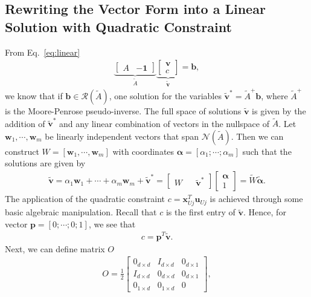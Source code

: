 \documentclass[%
preprint,
 amsmath,amssymb,
 aps,
]{revtex4-1}
\newcommand{\mc}{\mathcal}
\begin{document}
\subsection{Rewriting the Vector Form into a Linear Solution with Quadratic Constraint}
From Eq.~\ref{eq:linear}
\begin{align*}
\underbrace{
	\begin{bmatrix}
	A & -\bm{1}
	\end{bmatrix}
}_{\tilde{A}}
\underbrace{
	\begin{bmatrix}
	\bm{v}\\
	c
	\end{bmatrix}
}_{\tilde{\bm{v}}}
=
\bm{b},
\end{align*}
we know that if $\bm{b} \in \mc R(\tilde{A})$, one solution for the variables $\bm{\tilde{v}}^* = \tilde{A}^+ \bm{b}$, where $\tilde{A}^+$ is the Moore-Penrose pseudo-inverse. The full space of solutions $\tilde{\bm{v}}$ is given by the addition of $\bm{\tilde{v}}^*$ and any linear combination of vectors in the nullspace of $\tilde{A}$. Let ${\bm{w}_1, \dotsm, \bm{w}_m}$ be linearly independent vectors that span $\mc N(\tilde{A})$. Then we can construct $W = [\bm{w}_1, \dotsm, \bm{w}_m]$ with coordinates $\bm{\alpha} = [\alpha_1; \dotsm; \alpha_m]$ such that the solutions are given by 
\begin{align*}
\bm{\tilde{v}} = \alpha_1 \bm{w}_1 + \dotsm + \alpha_m \bm{w}_m + \bm{\tilde{v}}^* = 
\begin{bmatrix}
W & & \bm{\tilde{v}}^*
\end{bmatrix} 
\begin{bmatrix}
\bm{\alpha}\\
1
\end{bmatrix}
= \tilde{W} \tilde{\bm{\alpha}}.
\end{align*}
The application of the quadratic constraint $c = \bm{x}_{Uj}^T \bm{u}_{Uj}$ is achieved through some basic algebraic manipulation. Recall that $c$ is the first entry of $\bm{\tilde{v}}$. Hence, for vector $\bm{p} = [0; \dotsm; 0; 1]$, we see that
\begin{align*}
c = \bm{p}^T \bm{\tilde{v}}. 
\end{align*}
Next, we can define matrix $O$ 
\begin{align*}
O = \frac{1}{2}
\begin{bmatrix}
0_{d \times d} & I_{d \times d} & 0_{d \times 1}\\
I_{d \times d} & 0_{d \times d} & 0_{d \times 1} \\
0_{1 \times d} & 0_{1 \times d} & 0
\end{bmatrix},
\end{align*}
\end{document}
